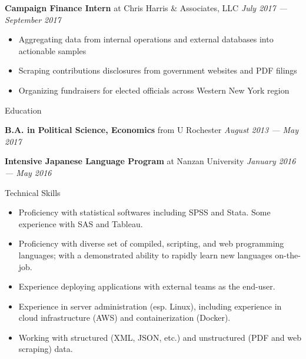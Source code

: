 \documentclass[12pt]{article}
\newenvironment{division}{
  \vspace{.1in} \large \bfseries
}{
  \hrulefill \normalsize \vspace{.1in}
}
\newenvironment{details}{
  \begin{itemize}[label={}] \small \setlength{\itemsep}{0pt}
}{
  \end{itemize} \normalsize
}
\begin{document}
\textbf{Campaign Finance Intern} at Chris Harris \& Associates, LLC \hfill \textit{July 2017 --- September 2017}
\begin{details}
  \item Aggregating data from internal operations and external databases into actionable samples
  \item Scraping contributions disclosures from government websites and PDF filings
  \item Organizing fundraisers for elected officials across Western New York region
\end{details}

\begin{division}
  Education
\end{division}

\textbf{B.A. in Political Science, Economics} from U Rochester \hfill \textit{August 2013 --- May 2017}

\textbf{Intensive Japanese Language Program} at Nanzan University \hfill \textit{January 2016 --- May 2016}

\vspace{.05in} %
\begin{division}
  Technical Skills
\end{division}

\begin{details}
  \item Proficiency with statistical softwares including SPSS and Stata. Some experience with SAS and Tableau.
  \item Proficiency with diverse set of compiled, scripting, and web programming languages; with a demonstrated ability to rapidly learn new languages on-the-job.
  \item Experience deploying applications with external teams as the end-user.
  \item Experience in server administration (esp. Linux), including experience in cloud infrastructure (AWS) and containerization (Docker).
  \item Working with structured (XML, JSON, etc.) and unstructured (PDF and web scraping) data.
\end{details}
\end{document}
